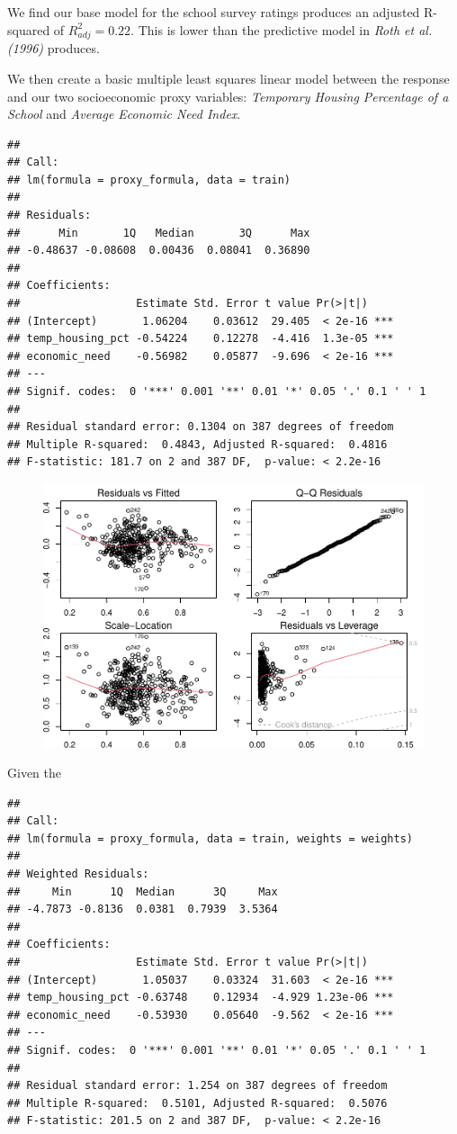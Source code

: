 \documentclass[
  man,floatsintext]{apa6}
\begin{document}
We find our base model for the school survey ratings produces an adjusted R-squared of \(R^2_{adj} = 0.22\). This is lower than the predictive model in \emph{Roth et al. (1996)} produces.

We then create a basic multiple least squares linear model between the response and our two socioeconomic proxy variables: \emph{Temporary Housing Percentage of a School} and \emph{Average Economic Need Index}.

\begin{verbatim}
## 
## Call:
## lm(formula = proxy_formula, data = train)
## 
## Residuals:
##      Min       1Q   Median       3Q      Max 
## -0.48637 -0.08608  0.00436  0.08041  0.36890 
## 
## Coefficients:
##                  Estimate Std. Error t value Pr(>|t|)    
## (Intercept)       1.06204    0.03612  29.405  < 2e-16 ***
## temp_housing_pct -0.54224    0.12278  -4.416  1.3e-05 ***
## economic_need    -0.56982    0.05877  -9.696  < 2e-16 ***
## ---
## Signif. codes:  0 '***' 0.001 '**' 0.01 '*' 0.05 '.' 0.1 ' ' 1
## 
## Residual standard error: 0.1304 on 387 degrees of freedom
## Multiple R-squared:  0.4843, Adjusted R-squared:  0.4816 
## F-statistic: 181.7 on 2 and 387 DF,  p-value: < 2.2e-16
\end{verbatim}

\begin{figure}[H]
\includegraphics[width=\textwidth]{final-project_files/figure-latex/plot-proxy-model-1} \caption{ }\label{fig:plot-proxy-model}
\end{figure}

Given the

\begin{verbatim}
## 
## Call:
## lm(formula = proxy_formula, data = train, weights = weights)
## 
## Weighted Residuals:
##     Min      1Q  Median      3Q     Max 
## -4.7873 -0.8136  0.0381  0.7939  3.5364 
## 
## Coefficients:
##                  Estimate Std. Error t value Pr(>|t|)    
## (Intercept)       1.05037    0.03324  31.603  < 2e-16 ***
## temp_housing_pct -0.63748    0.12934  -4.929 1.23e-06 ***
## economic_need    -0.53930    0.05640  -9.562  < 2e-16 ***
## ---
## Signif. codes:  0 '***' 0.001 '**' 0.01 '*' 0.05 '.' 0.1 ' ' 1
## 
## Residual standard error: 1.254 on 387 degrees of freedom
## Multiple R-squared:  0.5101, Adjusted R-squared:  0.5076 
## F-statistic: 201.5 on 2 and 387 DF,  p-value: < 2.2e-16
\end{verbatim}
\end{document}
